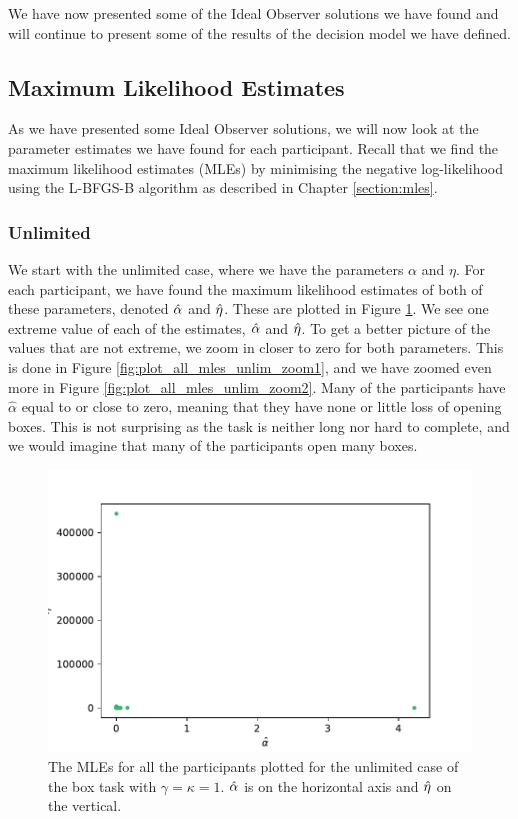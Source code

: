 We have now presented some of the Ideal Observer solutions we have found and will continue to present some of the results of the decision model we have defined. 




\subsection{Maximum Likelihood Estimates}
\label{chapter:mles}
As we have presented some Ideal Observer solutions, we will now look at the parameter estimates we have found for each participant. Recall that we find the maximum likelihood estimates (MLEs) by minimising the negative log-likelihood using the L-BFGS-B algorithm as described in Chapter \ref{section:mles}.


\subsubsection{Unlimited}
We start with the unlimited case, where we have the parameters $\alpha$ and $\eta$. For each participant, we have found the maximum likelihood estimates of both of these parameters, denoted $\hat{\alpha}$ and $\hat{\eta}$. These are plotted in Figure \ref{fig:plot_all_mles_unlim_zoom0}. We see one extreme value of each of the estimates, $\hat{\alpha}$ and $\hat{\eta}$. To get a better picture of the values that are not extreme, we zoom in closer to zero for both parameters. This is done in Figure \ref{fig:plot_all_mles_unlim_zoom1}, and we have zoomed even more in Figure \ref{fig:plot_all_mles_unlim_zoom2}. Many of the participants have $\hat{\alpha}$ equal to or close to zero, meaning that they have none or little loss of opening boxes. This is not surprising as the task is neither long nor hard to complete, and we would imagine that many of the participants open many boxes. 



\begin{figure}
    \centering
    \includegraphics[scale=0.7]{pictures/plotted_mles_unlim_gk1.pdf}
    \caption[MLEs of $\alpha$ and $\eta$, unlimited with $\gamma=\kappa=1$.]{The MLEs for all the participants plotted for the unlimited case of the box task with $\gamma=\kappa=1$. $\hat{\alpha}$ is on the horizontal axis and $\hat{\eta}$ on the vertical.}
    \label{fig:plot_all_mles_unlim_zoom0}
\end{figure}

